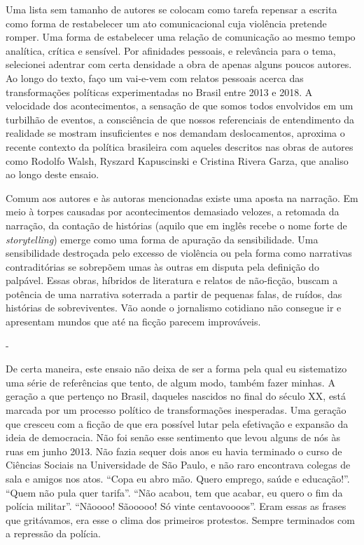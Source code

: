 Uma lista sem tamanho de autores se colocam como tarefa repensar a
escrita como forma de restabelecer um ato comunicacional cuja violência
pretende romper. Uma forma de estabelecer uma relação de comunicação ao
mesmo tempo analítica, crítica e sensível. Por afinidades pessoais, e
relevância para o tema, selecionei adentrar com certa densidade a obra
de apenas alguns poucos autores. Ao longo do texto, faço um vai-e-vem
com relatos pessoais acerca das transformações políticas experimentadas
no Brasil entre 2013 e 2018. A velocidade dos acontecimentos, a sensação
de que somos todos envolvidos em um turbilhão de eventos, a consciência
de que nossos referenciais de entendimento da realidade se mostram
insuficientes e nos demandam deslocamentos, aproxima o recente contexto
da política brasileira com aqueles descritos nas obras de autores como
Rodolfo Walsh, Ryszard Kapuscinski e Cristina Rivera Garza, que analiso
ao longo deste ensaio.

Comum aos autores e às autoras mencionadas existe uma aposta na
narração. Em meio à torpes causadas por acontecimentos demasiado
velozes, a retomada da narração, da contação de histórias (aquilo que em
inglês recebe o nome forte de \emph{storytelling}) emerge como uma forma
de apuração da sensibilidade. Uma sensibilidade destroçada pelo excesso
de violência ou pela forma como narrativas contraditórias se sobrepõem
umas às outras em disputa pela definição do palpável. Essas obras,
híbridos de literatura e relatos de não-ficção, buscam a potência de uma
narrativa soterrada a partir de pequenas falas, de ruídos, das histórias
de sobreviventes. Vão aonde o jornalismo cotidiano não consegue ir e
apresentam mundos que até na ficção parecem improváveis.

-

De certa maneira, este ensaio não deixa de ser a forma pela qual eu
sistematizo uma série de referências que tento, de algum modo, também
fazer minhas. A geração a que pertenço no Brasil, daqueles nascidos no
final do século XX, está marcada por um processo político de
transformações inesperadas. Uma geração que cresceu com a ficção de que
era possível lutar pela efetivação e expansão da ideia de democracia.
Não foi senão esse sentimento que levou alguns de nós às ruas em junho
2013. Não fazia sequer dois anos eu havia terminado o curso de Ciências
Sociais na Universidade de São Paulo, e não raro encontrava colegas de
sala e amigos nos atos. ``Copa eu abro mão. Quero emprego, saúde e
educação!''. ``Quem não pula quer tarifa''. ``Não acabou, tem que
acabar, eu quero o fim da polícia militar''. ``Nãoooo! Sãooooo! Só vinte
centavoooos''. Eram essas as frases que gritávamos, era esse o clima dos
primeiros protestos. Sempre terminados com a repressão da polícia.

